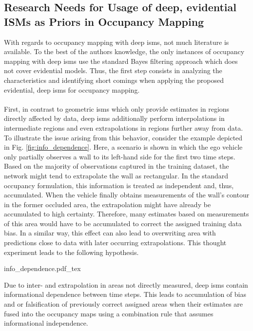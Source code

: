 \subsection{Research Needs for Usage of deep, evidential ISMs as Priors in Occupancy Mapping}
\label{subsec:research_needs_for_usage_of_deep_ims_as_priors_in_occmapping}
With regards to occupancy mapping with deep \gls{ism}s, not much literature is available. To the best of the authors knowledge, the only instances of occupancy mapping with deep \gls{ism}s use the standard Bayes filtering approach which does not cover evidential models. Thus, the first step consists in analyzing the characteristics and identifying short comings when applying the proposed evidential, deep \gls{ism}s for occupancy mapping.
\\\\
First, in contrast to geometric \gls{ism}s which only provide estimates in regions directly affected by data, deep \gls{ism}s additionally perform interpolations in intermediate regions and even extrapolations in regions further away from data. To illustrate the issue arising from this behavior, consider the example depicted in Fig. \ref{fig:info_dependence}. Here, a scenario is shown in which the ego vehicle only partially observes a wall to its left-hand side for the first two time steps. Based on the majority of observations captured in the training dataset, the network might tend to extrapolate the wall as rectangular. In the standard occupancy formulation, this information is treated as independent and, thus, accumulated. When the vehicle finally obtains measurements of the wall's contour in the former occluded area, the extrapolation might have already be accumulated to high certainty. Therefore, many estimates based on measurements of this area would have to be accumulated to correct the assigned training data bias. In a similar way, this effect can also lead to overwriting area with predictions close to data with later occurring extrapolations. This thought experiment leads to the following hypothesis.
\begin{center}
	{info_dependence.pdf_tex}
\end{center}
\begin{hyp} \label{hyp:temporal_dependence}
	Due to inter- and extrapolation in areas not directly measured, deep \gls{ism}s contain informational dependence between time steps. This leads to accumulation of bias and or falsification of previously correct assigned areas when their estimates are fused into the occupancy maps using a combination rule that assumes informational independence.  
\end{hyp} 
